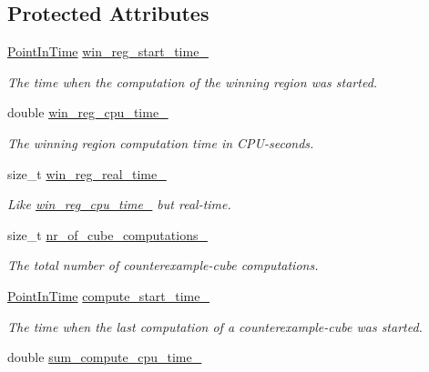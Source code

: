 \subsection*{Protected Attributes}
\begin{DoxyCompactItemize}
\item 
\hyperlink{Options_8h_af3a9f634f27bed7e98dbc23e5c6f807d}{Point\-In\-Time} \hyperlink{classLearnStatisticsQBF_a2c1d2ca27ab1a5edf496ffd603ba0878}{win\-\_\-reg\-\_\-start\-\_\-time\-\_\-}
\begin{DoxyCompactList}\small\item\em The time when the computation of the winning region was started. \end{DoxyCompactList}\item 
double \hyperlink{classLearnStatisticsQBF_a679a221c1cbf3330572f93d850976289}{win\-\_\-reg\-\_\-cpu\-\_\-time\-\_\-}
\begin{DoxyCompactList}\small\item\em The winning region computation time in C\-P\-U-\/seconds. \end{DoxyCompactList}\item 
size\-\_\-t \hyperlink{classLearnStatisticsQBF_a58013212d789d3c025b521cd150dc12d}{win\-\_\-reg\-\_\-real\-\_\-time\-\_\-}
\begin{DoxyCompactList}\small\item\em Like \hyperlink{classLearnStatisticsQBF_a679a221c1cbf3330572f93d850976289}{win\-\_\-reg\-\_\-cpu\-\_\-time\-\_\-} but real-\/time. \end{DoxyCompactList}\item 
size\-\_\-t \hyperlink{classLearnStatisticsQBF_a857dac1670c551b3dcf935860651143b}{nr\-\_\-of\-\_\-cube\-\_\-computations\-\_\-}
\begin{DoxyCompactList}\small\item\em The total number of counterexample-\/cube computations. \end{DoxyCompactList}\item 
\hyperlink{Options_8h_af3a9f634f27bed7e98dbc23e5c6f807d}{Point\-In\-Time} \hyperlink{classLearnStatisticsQBF_a820d051dbab21cb8df1ad673b04a0c92}{compute\-\_\-start\-\_\-time\-\_\-}
\begin{DoxyCompactList}\small\item\em The time when the last computation of a counterexample-\/cube was started. \end{DoxyCompactList}\item 
double \hyperlink{classLearnStatisticsQBF_a4caf75f422eed77570e5592ce35c9bd0}{sum\-\_\-compute\-\_\-cpu\-\_\-time\-\_\-}

\end{DoxyCompactItemize}
